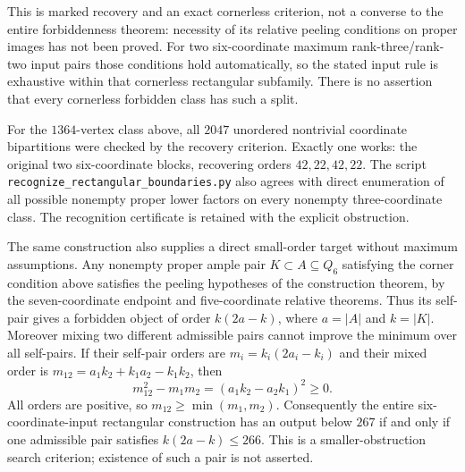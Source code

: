 \documentclass[11pt]{article}
\numberwithin{equation}{section}
\theoremstyle{definition}
\theoremstyle{remark}
\begin{document}
This is marked recovery and an exact cornerless criterion, not a
converse to the entire forbiddenness theorem: necessity of its relative
peeling conditions on proper images has not been proved. For two
six-coordinate maximum rank-three/rank-two input pairs those conditions
hold automatically, so the stated input rule is exhaustive within
that cornerless rectangular subfamily. There is no assertion that
every cornerless forbidden class has such a split.

For the $1364$-vertex class above, all $2047$ unordered nontrivial
coordinate bipartitions were checked by the recovery criterion.
Exactly one works: the original two six-coordinate blocks, recovering
orders $42,22,42,22$. The script
\texttt{recognize\_rectangular\_boundaries.py} also agrees with direct
enumeration of all possible nonempty proper lower factors on every
nonempty three-coordinate class. The recognition certificate is
retained with the explicit obstruction.

The same construction also supplies a direct small-order target without
maximum assumptions. Any nonempty proper ample pair $K\subset A\subseteq Q_6$
satisfying the corner condition above satisfies the peeling hypotheses
of the construction theorem, by the seven-coordinate endpoint and
five-coordinate relative theorems. Thus its self-pair gives a forbidden
object of order $k(2a-k)$, where $a=|A|$ and $k=|K|$.
Moreover mixing two different admissible pairs cannot improve the minimum
over all self-pairs. If their self-pair orders are
$m_i=k_i(2a_i-k_i)$ and their mixed order is
$m_{12}=a_1k_2+k_1a_2-k_1k_2$, then
\[
 m_{12}^2-m_1m_2=(a_1k_2-a_2k_1)^2\ge0.
\]
All orders are positive, so $m_{12}\ge\min(m_1,m_2)$.
Consequently the entire six-coordinate-input rectangular construction
has an output below $267$ if and only if one admissible pair satisfies
$k(2a-k)\le266$. This is a smaller-obstruction search criterion;
existence of such a pair is not asserted.
\end{document}
